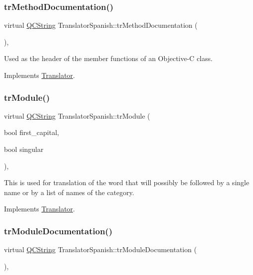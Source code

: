 \subsubsection{\texorpdfstring{trMethodDocumentation()}{trMethodDocumentation()}}
{\footnotesize\ttfamily virtual \mbox{\hyperlink{class_q_c_string}{Q\+C\+String}} Translator\+Spanish\+::tr\+Method\+Documentation (\begin{DoxyParamCaption}{ }\end{DoxyParamCaption})\hspace{0.3cm}{\ttfamily [inline]}, {\ttfamily [virtual]}}

Used as the header of the member functions of an Objective-\/C class. 

Implements \mbox{\hyperlink{class_translator}{Translator}}.

\mbox{\label{class_translator_spanish_afb5f7f0f5a0727ad700a30ea0ca81048}} 
\subsubsection{\texorpdfstring{trModule()}{trModule()}}
{\footnotesize\ttfamily virtual \mbox{\hyperlink{class_q_c_string}{Q\+C\+String}} Translator\+Spanish\+::tr\+Module (\begin{DoxyParamCaption}\item[{bool}]{first\+\_\+capital,  }\item[{bool}]{singular }\end{DoxyParamCaption})\hspace{0.3cm}{\ttfamily [inline]}, {\ttfamily [virtual]}}

This is used for translation of the word that will possibly be followed by a single name or by a list of names of the category. 

Implements \mbox{\hyperlink{class_translator}{Translator}}.

\mbox{\label{class_translator_spanish_ac9310a5e42bd38523f3ae8ef4051c04e}} 
\subsubsection{\texorpdfstring{trModuleDocumentation()}{trModuleDocumentation()}}
{\footnotesize\ttfamily virtual \mbox{\hyperlink{class_q_c_string}{Q\+C\+String}} Translator\+Spanish\+::tr\+Module\+Documentation (\begin{DoxyParamCaption}{ }\end{DoxyParamCaption})\hspace{0.3cm}{\ttfamily [inline]}, {\ttfamily [virtual]}}

